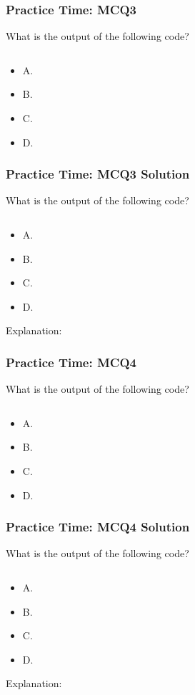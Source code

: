 \documentclass{beamer}
\begin{document}
\begin{frame}[fragile]
    \frametitle{Practice Time: MCQ3}
    What is the output of the following code?
    \begin{verbatim}
    \end{verbatim}
    \begin{itemize}
        \item A.
        \item B.
        \item C.
        \item D.
    \end{itemize}
\end{frame}
\begin{frame}[fragile]
    \frametitle{Practice Time: MCQ3 Solution}
    What is the output of the following code?
    \begin{verbatim}
    \end{verbatim}
    \begin{itemize}
        \item A.
        \item B.
        \item C.
        \item D.
    \end{itemize}

    Explanation:
\end{frame}
\begin{frame}[fragile]
    \frametitle{Practice Time: MCQ4}
    What is the output of the following code?
    \begin{verbatim}
    \end{verbatim}
    \begin{itemize}
        \item A.
        \item B.
        \item C.
        \item D.
    \end{itemize}
\end{frame}
\begin{frame}[fragile]
    \frametitle{Practice Time: MCQ4 Solution}
    What is the output of the following code?
    \begin{verbatim}
    \end{verbatim}
    \begin{itemize}
        \item A.
        \item B.
        \item C.
        \item D.
    \end{itemize}

    Explanation:
\end{frame}
\end{document}
